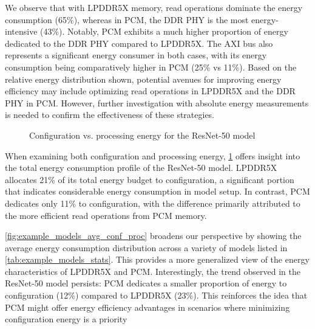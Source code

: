 We observe that with LPDDR5X memory, read operations dominate the energy consumption (65\%), whereas in PCM, the DDR PHY is the most energy-intensive (43\%).
Notably, PCM exhibits a much higher proportion of energy dedicated to the DDR PHY compared to LPDDR5X.
The AXI bus also represents a significant energy consumer in both cases, with its energy consumption being comparatively higher in PCM (25\% vs 11\%).
Based on the relative energy distribution shown, potential avenues for improving energy efficiency may include optimizing read operations in LPDDR5X and the DDR PHY in PCM.
However, further investigation with absolute energy measurements is needed to confirm the effectiveness of these strategies.

\begin{figure}[hbtp]
    \centering
    \hfill
    \caption{Configuration vs. processing energy for the ResNet-50 model}
    \label{fig:resnet50_conf_proc}
\end{figure}

When examining both configuration and processing energy, \cref{fig:resnet50_conf_proc} offers insight into the total energy consumption profile of the ResNet-50 model.
LPDDR5X allocates 21\% of its total energy budget to configuration, a significant portion that indicates considerable energy consumption in model setup.
In contrast, PCM dedicates only 11\% to configuration, with the difference primarily attributed to the more efficient read operations from PCM memory.

\cref{fig:example_models_avg_conf_proc} broadens our perspective by showing the average energy consumption distribution across a variety of models listed in \cref{tab:example_models_stats}.
This provides a more generalized view of the energy characteristics of LPDDR5X and PCM.
Interestingly, the trend observed in the ResNet-50 model persists: PCM dedicates a smaller proportion of energy to configuration (12\%) compared to LPDDR5X (23\%).
This reinforces the idea that PCM might offer energy efficiency advantages in scenarios where minimizing configuration energy is a priority

